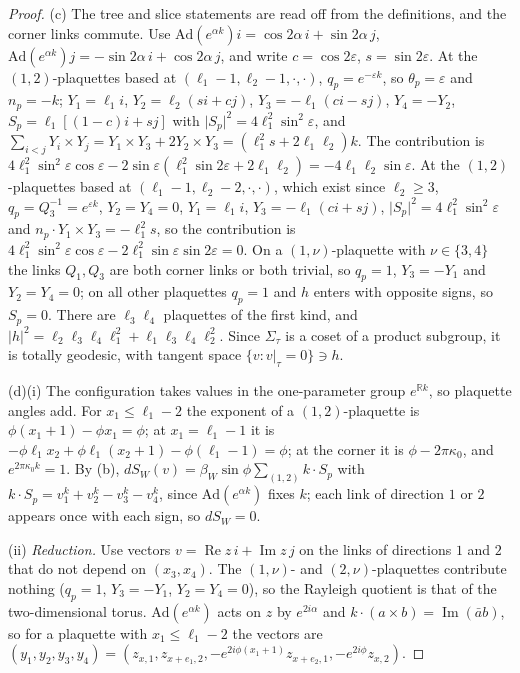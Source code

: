 \documentclass[11pt,a4paper]{amsart}
\theoremstyle{definition}
\theoremstyle{remark}
\numberwithin{equation}{section}
\newcommand{\R}{\mathbb{R}}          %
\newcommand{\abs}[1]{\lvert #1\rvert}      %
\newcommand{\betaW}{\beta_{W}}             %
\begin{document}
\begin{proof}
(c) The tree and slice statements are read off from the definitions, and the corner links commute. Use $\mathrm{Ad}(e^{\alpha k})i=\cos2\alpha\,i+\sin2\alpha\,j$, $\mathrm{Ad}(e^{\alpha k})j=-\sin2\alpha\,i+\cos2\alpha\,j$, and write $c=\cos2\varepsilon$, $s=\sin2\varepsilon$. At the $(1,2)$-plaquettes based at $(\ell_1-1,\ell_2-1,\cdot,\cdot)$, $q_p=e^{-\varepsilon k}$, so $\theta_p=\varepsilon$ and $n_p=-k$; $Y_1=\ell_1i$, $Y_2=\ell_2(si+cj)$, $Y_3=-\ell_1(ci-sj)$, $Y_4=-Y_2$, $S_p=\ell_1[(1-c)i+sj]$ with $\abs{S_p}^2=4\ell_1^2\sin^2\varepsilon$, and $\sum_{i<j}Y_i\times Y_j=Y_1\times Y_3+2Y_2\times Y_3=(\ell_1^2s+2\ell_1\ell_2)k$. The contribution is $4\ell_1^2\sin^2\varepsilon\cos\varepsilon-2\sin\varepsilon(\ell_1^2\sin2\varepsilon+2\ell_1\ell_2)=-4\ell_1\ell_2\sin\varepsilon$. At the $(1,2)$-plaquettes based at $(\ell_1-1,\ell_2-2,\cdot,\cdot)$, which exist since $\ell_2\ge3$, $q_p=Q_3^{-1}=e^{\varepsilon k}$, $Y_2=Y_4=0$, $Y_1=\ell_1i$, $Y_3=-\ell_1(ci+sj)$, $\abs{S_p}^2=4\ell_1^2\sin^2\varepsilon$ and $n_p\cdot Y_1\times Y_3=-\ell_1^2s$, so the contribution is $4\ell_1^2\sin^2\varepsilon\cos\varepsilon-2\ell_1^2\sin\varepsilon\sin2\varepsilon=0$. On a $(1,\nu)$-plaquette with $\nu\in\{3,4\}$ the links $Q_1,Q_3$ are both corner links or both trivial, so $q_p=1$, $Y_3=-Y_1$ and $Y_2=Y_4=0$; on all other plaquettes $q_p=1$ and $h$ enters with opposite signs, so $S_p=0$. There are $\ell_3\ell_4$ plaquettes of the first kind, and $\abs h^2=\ell_2\ell_3\ell_4\ell_1^2+\ell_1\ell_3\ell_4\ell_2^2$. Since $\Sigma_\tau$ is a coset of a product subgroup, it is totally geodesic, with tangent space $\{v:v|_\tau=0\}\ni h$.

(d)(i) The configuration takes values in the one-parameter group $e^{\R k}$, so plaquette angles add. For $x_1\le\ell_1-2$ the exponent of a $(1,2)$-plaquette is $\phi(x_1+1)-\phi x_1=\phi$; at $x_1=\ell_1-1$ it is $-\phi\ell_1x_2+\phi\ell_1(x_2+1)-\phi(\ell_1-1)=\phi$; at the corner it is $\phi-2\pi\kappa_0$, and $e^{2\pi\kappa_0 k}=1$. By (b), $dS_W(v)=\betaW\sin\phi\sum_{(1,2)}k\cdot S_p$ with $k\cdot S_p=v^k_1+v^k_2-v^k_3-v^k_4$, since $\mathrm{Ad}(e^{\alpha k})$ fixes $k$; each link of direction $1$ or $2$ appears once with each sign, so $dS_W=0$.

(ii) \emph{Reduction.} Use vectors $v=\operatorname{Re}z\,i+\operatorname{Im}z\,j$ on the links of directions $1$ and $2$ that do not depend on $(x_3,x_4)$. The $(1,\nu)$- and $(2,\nu)$-plaquettes contribute nothing ($q_p=1$, $Y_3=-Y_1$, $Y_2=Y_4=0$), so the Rayleigh quotient is that of the two-dimensional torus. $\mathrm{Ad}(e^{\alpha k})$ acts on $z$ by $e^{2i\alpha}$ and $k\cdot(a\times b)=\operatorname{Im}(\bar ab)$, so for a plaquette with $x_1\le\ell_1-2$ the vectors are $(y_1,y_2,y_3,y_4)=(z_{x,1},z_{x+e_1,2},-e^{2i\phi(x_1+1)}z_{x+e_2,1},-e^{2i\phi}z_{x,2})$.


\end{proof}
\end{document}
